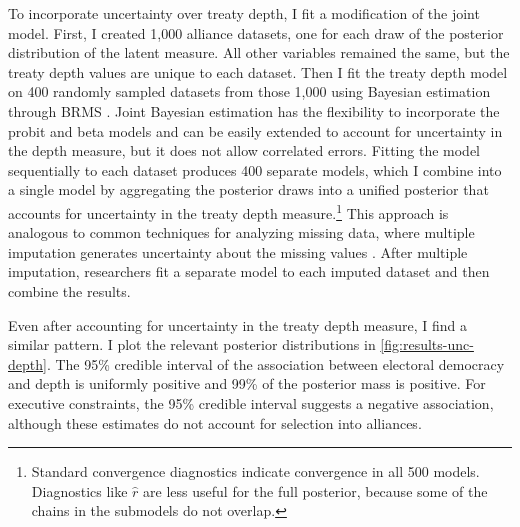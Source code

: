 \documentclass[12pt]{article}
\begin{document}
To incorporate uncertainty over treaty depth, I fit a modification of the joint model. 
First, I created 1,000 alliance datasets, one for each draw of the posterior distribution of the latent measure.
All other variables remained the same, but the treaty depth values are unique to each dataset. 
Then I fit the treaty depth model on 400 randomly sampled datasets from those 1,000 using Bayesian estimation through BRMS \citep{Buerkner2017}. 
Joint Bayesian estimation has the flexibility to incorporate the probit and beta models and can be easily extended to account for uncertainty in the depth measure, but it does not allow correlated errors. 
Fitting the model sequentially to each dataset produces 400 separate models, which I combine into a single model by aggregating the posterior draws into a unified posterior that accounts for uncertainty in the treaty depth measure.\footnote{Standard convergence diagnostics indicate convergence in all 500 models. Diagnostics like $\hat{r}$ are less useful for the full posterior, because some of the chains in the submodels do not overlap.}
This approach is analogous to common techniques for analyzing missing data, where multiple imputation generates uncertainty about the missing values \citep{Hollenbachetal2018imp}.
After multiple imputation, researchers fit a separate model to each imputed dataset and then combine the results. 


Even after accounting for uncertainty in the treaty depth measure, I find a similar pattern. 
I plot the relevant posterior distributions in \autoref{fig:results-unc-depth}. 
The 95\% credible interval of the association between electoral democracy and depth is uniformly positive and 99\% of the posterior mass is positive. 
For executive constraints, the 95\% credible interval suggests a negative association, although these estimates do not account for selection into alliances. 
\end{document}
